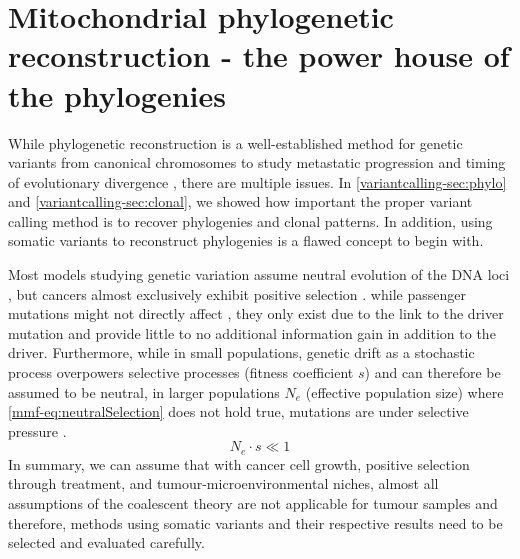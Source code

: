 \section[Mitochondrial phylogenetic reconstruction]{Mitochondrial phylogenetic reconstruction - the power house of the phylogenies}
\label{cascade-sec:mitochondria}

While phylogenetic reconstruction is a well-established method for genetic variants from canonical chromosomes to study metastatic progression and timing of evolutionary divergence \cite{Deshwar2015,Brown2017,Hu2019}, there are multiple issues. In \autoref{variantcalling-sec:phylo} and \autoref{variantcalling-sec:clonal}, we showed how important the proper variant calling method is to  recover phylogenies and clonal patterns. In addition, using somatic variants to reconstruct phylogenies is a flawed concept to begin with. 

Most models studying genetic variation assume neutral evolution of the DNA loci \cite{Kimura1968,Lynch1989}, but cancers almost exclusively exhibit positive selection \cite{Cannataro2018}.  while passenger mutations might not directly affect  , they only exist due to the link to the driver mutation and  provide little to no additional information gain in addition to the driver. Furthermore, while in small populations, genetic drift as a stochastic process overpowers selective processes (fitness coefficient $s$) and can therefore be assumed to be neutral, in larger populations $N_e$ (effective population size) where \autoref{mmf-eq:neutralSelection} does not hold true, mutations are under selective pressure \cite{EyreWalker2007}.
\begin{equation}
N_e \cdot s \ll 1 \label{mmf-eq:neutralSelection}
\end{equation}
\myequation[\ref{mmf-eq:neutralSelection}]{Selective pressure with effective population size}
\vspace{-3em}
In summary, we can assume that with cancer cell growth, positive selection through treatment, and tumour-microenvironmental niches, almost all assumptions of the coalescent theory \cite{Kingman1982} are not applicable for tumour samples and therefore, methods using somatic variants and their respective results need to be selected and evaluated carefully.

